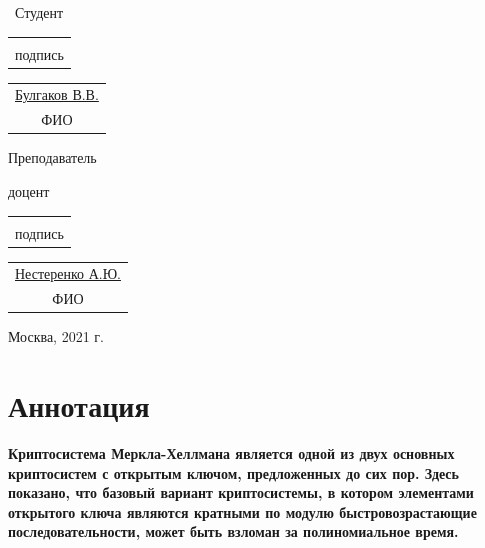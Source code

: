 \documentclass[a4paper,12pt]{report}
\begin{document}
\begin{multicols}{2}
\begin{flushleft}
~Студент\par\:\par
\begin{tabular}{c}
\underline{\hspace{8em}} \vspace{-2mm}\\
{\tiny {\color{graylight}подпись}}
\end{tabular}
\begin{tabular}{c}
\underline{\hspace{2em}Булгаков В.В.\hspace{1em}}\\
{\tiny{\color{graylight} ФИО}}
\end{tabular}
\end{flushleft}

\begin{flushright}
Преподаватель

доцент
\end{flushright}

\begin{tabular}{c}
\underline{\hspace{8em}} \vspace{-1mm}\\
{\tiny {\color{graylight}подпись}}
\end{tabular}
\begin{tabular}{c}
\underline{\hspace{2em}Нестеренко А.Ю.\hspace{1em}} \vspace{-1mm}\\
{\tiny{\color{graylight} ФИО}}
\end{tabular}
\end{multicols}

\vfill
\begin{center}Москва, 2021 г.\end{center}

\newpage

\tableofcontents

\chapter{Аннотация}

\textbf{Криптосистема Меркла-Хеллмана является одной из двух основных криптосистем с открытым ключом, предложенных до сих пор. Здесь показано, что базовый вариант криптосистемы, в котором элементами открытого ключа являются кратными по модулю быстровозрастающие последовательности, может быть взломан за полиномиальное время.}
\end{document}
